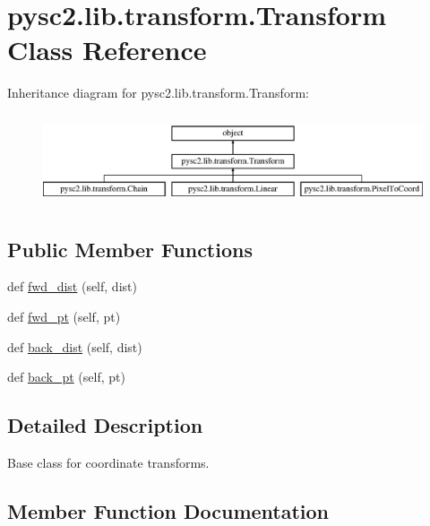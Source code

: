 \hypertarget{classpysc2_1_1lib_1_1transform_1_1_transform}{}\section{pysc2.\+lib.\+transform.\+Transform Class Reference}
\label{classpysc2_1_1lib_1_1transform_1_1_transform}
Inheritance diagram for pysc2.\+lib.\+transform.\+Transform\+:\begin{figure}[H]
\begin{center}
\leavevmode
\includegraphics[height=2.692308cm]{classpysc2_1_1lib_1_1transform_1_1_transform}
\end{center}
\end{figure}
\subsection*{Public Member Functions}
\begin{DoxyCompactItemize}
\item 
def \mbox{\hyperlink{classpysc2_1_1lib_1_1transform_1_1_transform_a0e63ffb003a6567418d8205eca488ec2}{fwd\+\_\+dist}} (self, dist)
\item 
def \mbox{\hyperlink{classpysc2_1_1lib_1_1transform_1_1_transform_a0df7bdb41fe83c2f8e16f98a5690f0ba}{fwd\+\_\+pt}} (self, pt)
\item 
def \mbox{\hyperlink{classpysc2_1_1lib_1_1transform_1_1_transform_a3a632e40b0dc24f7491187dff96582ad}{back\+\_\+dist}} (self, dist)
\item 
def \mbox{\hyperlink{classpysc2_1_1lib_1_1transform_1_1_transform_a2b1e85dd14f1db61e20bbbc2d92d3e0c}{back\+\_\+pt}} (self, pt)
\end{DoxyCompactItemize}


\subsection{Detailed Description}
\begin{DoxyVerb}Base class for coordinate transforms.\end{DoxyVerb}
 

\subsection{Member Function Documentation}
\mbox{\label{classpysc2_1_1lib_1_1transform_1_1_transform_a3a632e40b0dc24f7491187dff96582ad}} 
